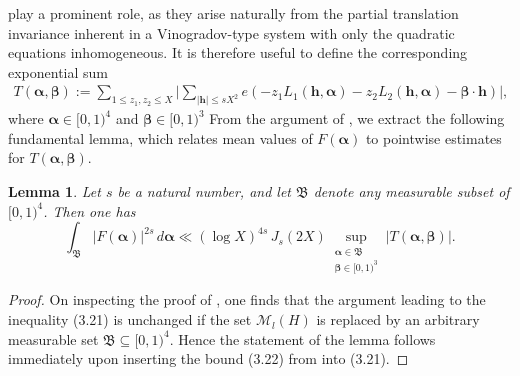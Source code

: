 \documentclass{amsart}%
\numberwithin{equation}{section}
\newtheorem{lemma}[theorem]{Lemma}
\theoremstyle{remark}
\newcommand{\bh}{{\boldsymbol h}}
\newcommand{\1}{\mathbbm{1}}
\newcommand{\fB}{\mathfrak{B}}
\newcommand{\balp}{\boldsymbol{\alpha}}
\newcommand{\bbet}{\boldsymbol{\beta}}
\begin{document}
play a prominent role, as they arise naturally from the partial translation invariance inherent in a Vinogradov-type system with only the quadratic equations inhomogeneous. It is therefore useful to define the corresponding exponential sum %
\begin{equation}\label{T def}
\begin{aligned}
T(\boldsymbol{\alpha},\boldsymbol{\beta}):=\sum_{1\leq z_1,z_2\leq X}\biggl|\sum_{|\bh|\leq sX^{2}}e(-z_1L_1(\bh,\boldsymbol{\alpha})-z_2L_2(\bh,\boldsymbol{\alpha})-\boldsymbol{\beta}\cdot \bh)\biggr|,
\end{aligned}
\end{equation} 
where $\balp \in [0,1)^4$ and $\bbet \in [0,1)^3$
From the argument of \cite[Lemma 3.1]{ky2026}, we extract the following fundamental lemma, which relates mean values of $F(\boldsymbol{\alpha})$ to pointwise estimates for $T(\boldsymbol{\alpha},\boldsymbol{\beta})$.

\begin{lemma}\label{reduction to T}
Let $s$ be a natural number, and let $\fB$ denote any measurable subset of $[0,1)^{4}$. Then one has
\begin{equation*}
\int_{\fB}|F(\boldsymbol{\alpha})|^{2s}\,d\boldsymbol{\alpha} \ll (\log X)^{4s} \, J_s(2X) \sup_{\substack{\boldsymbol{\alpha}\in \fB\\ \boldsymbol{\beta}\in [0,1)^3 }} |T(\boldsymbol{\alpha},\boldsymbol{\beta})|.
\end{equation*}
\end{lemma}

\begin{proof}
On inspecting the proof of \cite[Lemma 3.1]{ky2026}, one finds that the argument leading to the inequality (3.21) is unchanged if the set ${\mathcal M}_l(H)$ is replaced by an arbitrary measurable set ${\mathfrak B} \subseteq [0,1)^4$. Hence the statement of the lemma follows immediately upon inserting the bound (3.22) from \cite{ky2026} into (3.21).
\end{proof}


\end{document}
